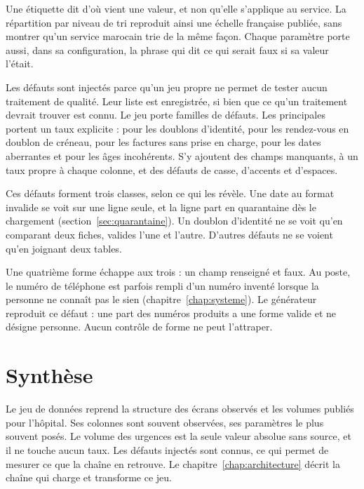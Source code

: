 Une étiquette dit d'où vient une valeur, et non qu'elle s'applique au service. La répartition par
niveau de tri reproduit ainsi une échelle française publiée, sans montrer qu'un service marocain
trie de la même façon. Chaque paramètre porte aussi, dans sa configuration, la phrase qui dit ce
qui serait faux si sa valeur l'était.

Les défauts sont injectés parce qu'un jeu propre ne permet de tester aucun traitement de qualité.
Leur liste est enregistrée, si bien que ce qu'un traitement devrait trouver est connu.
Le jeu porte  familles de défauts. Les principales portent un taux
explicite :  pour les doublons d'identité,
 pour les rendez-vous en doublon de créneau,
 pour les factures sans prise en charge,
 pour les dates aberrantes et 
pour les âges incohérents. S'y ajoutent des champs manquants, à un taux propre à chaque colonne, et
des défauts de casse, d'accents et d'espaces.

Ces défauts forment trois classes, selon ce qui les révèle. Une date au format invalide se voit sur
une ligne seule, et la ligne part en quarantaine dès le chargement (section~\ref{sec:quarantaine}).
Un doublon d'identité ne se voit qu'en comparant deux fiches, valides l'une et l'autre. D'autres
défauts ne se voient qu'en joignant deux tables.

Une quatrième forme échappe aux trois : un champ renseigné et faux. Au poste, le numéro de
téléphone est parfois rempli d'un numéro inventé lorsque la personne ne connaît pas le sien
(chapitre~\ref{chap:systeme}). Le générateur reproduit ce défaut : une part des numéros produits a
une forme valide et ne désigne personne. Aucun contrôle de forme ne peut l'attraper.

\section*{Synthèse}

Le jeu de données reprend la structure des écrans observés et les volumes publiés pour l'hôpital.
Ses colonnes sont souvent observées, ses paramètres le plus souvent posés. Le volume des urgences
est la seule valeur absolue sans source, et il ne touche aucun taux. Les défauts injectés sont
connus, ce qui permet de mesurer ce que la chaîne en retrouve. Le chapitre~\ref{chap:architecture}
décrit la chaîne qui charge et transforme ce jeu.
